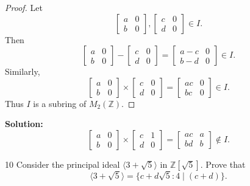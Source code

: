 \begin{proof}
    Let 
    \[\begin{bmatrix}
        a & 0 \\[2mm] 
        b & 0
    \end{bmatrix}, \begin{bmatrix}
        c & 0 \\[2mm] 
        d & 0
    \end{bmatrix} \in I.\]
    Then 
    \[\begin{bmatrix}
        a & 0 \\[2mm] 
        b & 0
    \end{bmatrix} - \begin{bmatrix}
        c & 0 \\[2mm] 
        d & 0
    \end{bmatrix} = \begin{bmatrix}
        a - c & 0 \\[2mm] 
        b - d & 0
    \end{bmatrix} \in I.\]
    Similarly,
    \[\begin{bmatrix}
        a & 0 \\[2mm] 
        b & 0
    \end{bmatrix} \times \begin{bmatrix}
        c & 0 \\[2mm] 
        d & 0
    \end{bmatrix} = \begin{bmatrix}
        ac & 0 \\[2mm] 
        bc & 0
    \end{bmatrix} \in I.\]
    Thus $I$ is a subring of $M_2(\mathbb{Z})$.
\end{proof}

\textbf{Solution: }
\[\begin{bmatrix}
    a & 0 \\[2mm] 
    b & 0
\end{bmatrix} \times \begin{bmatrix}
    c & 1 \\[2mm] 
    d & 0
\end{bmatrix} = \begin{bmatrix}
    ac & a \\[2mm] 
    bd & b
\end{bmatrix} \notin I.\]

\begin{problem}{10}
    Consider the principal ideal $\langle 3 + \sqrt{5} \rangle$ in $\mathbb{Z}[\sqrt{5}]$.
    Prove that
    \[\langle 3 + \sqrt{5} \rangle = \{c + d\sqrt{5} : 4 \mid (c + d)\}.\]
\end{problem}
\unsolved

